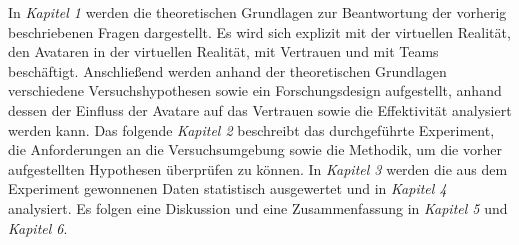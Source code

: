\documentclass[a4paper,11pt]{article}%
\renewcommand{\\}{\vspace*{0.5\baselineskip} \newline}
\begin{document}
In \textit{Kapitel 1} werden die theoretischen Grundlagen zur Beantwortung der vorherig beschriebenen Fragen dargestellt. Es wird sich explizit mit der virtuellen Realität, den Avataren in der virtuellen Realität, mit Vertrauen und mit Teams beschäftigt.
Anschließend werden anhand der theoretischen Grundlagen verschiedene Versuchshypothesen sowie ein Forschungsdesign aufgestellt, anhand dessen der Einfluss der Avatare auf das Vertrauen sowie die Effektivität analysiert werden kann.
Das folgende \textit{Kapitel 2} beschreibt das durchgeführte Experiment, die Anforderungen an die Versuchsumgebung sowie die Methodik, um die vorher aufgestellten Hypothesen überprüfen zu können. 
In \textit{Kapitel 3} werden die aus dem Experiment gewonnenen Daten statistisch ausgewertet und in \textit{Kapitel 4} analysiert.
Es folgen eine Diskussion und eine Zusammenfassung in \textit{Kapitel 5} und \textit{Kapitel 6}.
\end{document}
